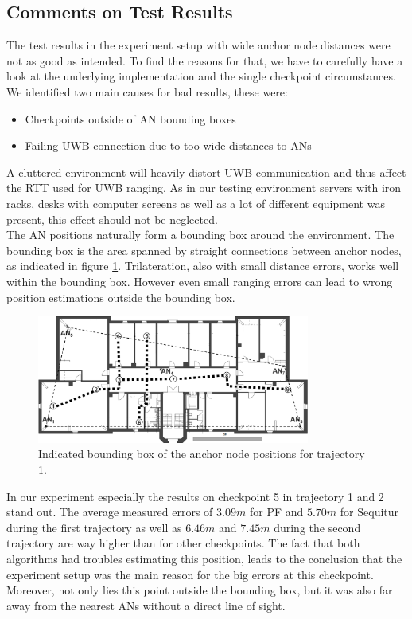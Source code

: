 \subsection{Comments on Test Results}
\label{Section2}
The test results in the experiment setup with wide anchor node distances were not as good as intended. To find the reasons for that, we have to carefully have a look at the underlying implementation and the single checkpoint circumstances. We identified two main causes for bad results, these were:
\begin{itemize}
\item Checkpoints outside of AN bounding boxes
\item Failing UWB connection due to too wide distances to ANs
\end{itemize}
A cluttered environment will heavily distort UWB communication and thus affect the RTT used for UWB ranging. As in our testing environment servers with iron racks, desks with computer screens as well as a lot of different equipment was present, this effect should not be neglected.\\
\noindent\hspace*{5mm}%
The AN positions naturally form a bounding box around the environment. The bounding box is the area spanned by straight connections between anchor nodes, as indicated in figure \ref{fig:trajectory1_boundingBox}. Trilateration, also with small distance errors, works well within the bounding box. However even small ranging errors can lead to wrong position estimations outside the bounding box. 
\begin{figure}[th]
\centering
\includegraphics[width=0.8\textwidth]{Figures/trajectory1_boundingBox}
\decoRule
\caption[Bounding Box and Checkpoints for Trajectory 1 ]{Indicated bounding box of the anchor node positions for trajectory 1.}
\label{fig:trajectory1_boundingBox}
\end{figure}
In our experiment especially the results on checkpoint 5 in trajectory 1 and 2 stand out. The average measured errors of $3.09m$ for PF and $5.70m$ for Sequitur during the first trajectory as well as $6.46m$ and $7.45m$ during the second trajectory are way higher than for other checkpoints. The fact that both algorithms had troubles estimating this position, leads to the conclusion that the experiment setup was the main reason for the big errors at this checkpoint. Moreover, not only lies this point outside the bounding box, but it was also far away from the nearest ANs without a direct line of sight.\\
